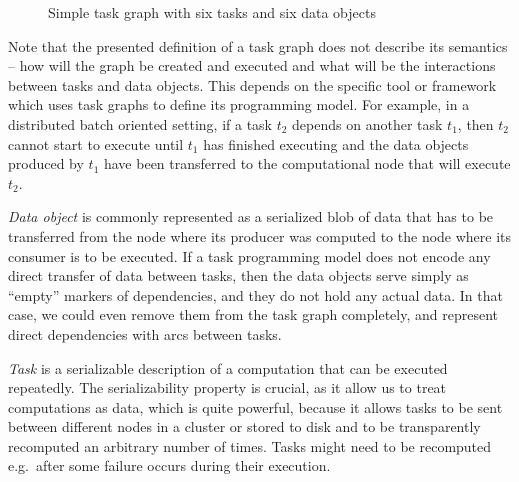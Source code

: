 \begin{figure}[h]
	\centering
	\caption{Simple task graph with six tasks and six data objects}
	\label{fig:task-graph-example}
\end{figure}

Note that the presented definition of a task graph does not describe its semantics -- how will the
graph be created and executed and what will be the interactions between tasks and data objects.
This depends on the specific tool or framework which uses task graphs to define its programming
model. For example, in a distributed batch oriented setting, if a task $t_2$
depends on another task $t_1$, then $t_2$ cannot start to execute
until $t_1$ has finished executing and the data objects produced by
$t_1$ have been transferred to the computational node that will execute
$t_2$.

\emph{Data object} is commonly represented as a serialized blob of data that has to be
transferred from the node where its producer was computed to the node where its consumer is to be
executed. If a task programming model does not encode any direct transfer of data between tasks,
then the data objects serve simply as ``empty'' markers of dependencies, and they do not hold any
actual data. In that case, we could even remove them from the task graph completely, and represent
direct dependencies with arcs between tasks.

\emph{Task} is a serializable description of a computation that can be executed
repeatedly. The serializability property is crucial, as it allow us to treat computations as data,
which is quite powerful, because it allows tasks to be sent between different nodes in a cluster or
stored to disk and to be transparently recomputed an arbitrary number of times. Tasks might need to
be recomputed e.g.\ after some failure occurs during their execution.

